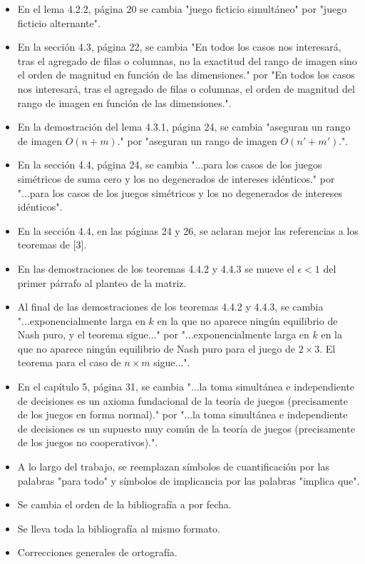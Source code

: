 \documentclass{article}
\begin{document}
\begin{itemize}
    \item En el lema 4.2.2, página 20 se cambia "juego ficticio simultáneo" por "juego ficticio alternante".
    \item En la sección 4.3, página 22, se cambia "En todos los casos nos interesará, tras el agregado de filas o columnas, no la exactitud del rango de imagen sino el orden de magnitud en función de las dimensiones." por "En todos los casos nos interesará, tras el agregado de filas o columnas, el orden de magnitud del rango de imagen en función de las dimensiones.".
    \item En la demostración del lema 4.3.1, página 24, se cambia "aseguran un rango de imagen $O(n+m)$." por "aseguran un rango de imagen $O(n'+m')$.".
    \item En la sección 4.4, página 24, se cambia "...para los casos de los juegos simétricos de suma cero y los no degenerados de intereses idénticos." por "...para los casos de los juegos simétricos y los no degenerados de intereses idénticos".
    \item En la sección 4.4, en las páginas 24 y 26, se aclaran mejor las referencias a los teoremas de [3].
    \item En las demostraciones de los teoremas 4.4.2 y 4.4.3 se mueve el $\epsilon < 1$ del primer párrafo al planteo de la matriz.
    \item Al final de las demostraciones de los teoremas 4.4.2 y 4.4.3, se cambia "...exponencialmente larga en $k$ en la que no aparece ningún equilibrio de Nash puro, y el teorema sigue..." por "...exponencialmente larga en $k$ en la que no aparece ningún equilibrio de Nash puro para el juego de $2 \times 3$. El teorema para el caso de $n \times m$ sigue...".
    \item En el capítulo 5, página 31, se cambia "...la toma simultánea e independiente de decisiones es un axioma fundacional de la teoría de juegos (precisamente de los juegos en forma normal)." por "...la toma simultánea e independiente de decisiones es un supuesto muy común de la teoría de juegos (precisamente de los juegos no cooperativos).".
    \item A lo largo del trabajo, se reemplazan símbolos de cuantificación por las palabras "para todo" y símbolos de implicancia por las palabras "implica que".
    \item Se cambia el orden de la bibliografía a por fecha.
    \item Se lleva toda la bibliografía al mismo formato.
    \item Correcciones generales de ortografía.
\end{itemize}
\end{document}
